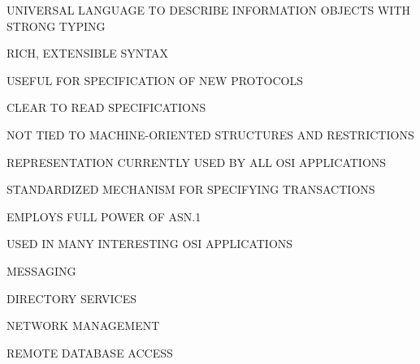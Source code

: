 \begin{bwslide}

\begin{nrtc}
\item	UNIVERSAL LANGUAGE TO DESCRIBE INFORMATION OBJECTS WITH STRONG TYPING

\item	RICH, EXTENSIBLE SYNTAX

\item	USEFUL FOR SPECIFICATION OF NEW PROTOCOLS
    \begin{nrtc}
    \item	CLEAR TO READ SPECIFICATIONS

    \item	NOT TIED TO MACHINE-ORIENTED STRUCTURES AND RESTRICTIONS
    \end{nrtc}

\item	REPRESENTATION CURRENTLY USED BY ALL OSI APPLICATIONS
\end{nrtc}
\end{bwslide}


\begin{bwslide}

\begin{nrtc}
\item	STANDARDIZED MECHANISM FOR SPECIFYING TRANSACTIONS

\item	EMPLOYS FULL POWER OF ASN.1

\item	USED IN MANY INTERESTING OSI APPLICATIONS
    \begin{nrtc}
    \item	MESSAGING

    \item	DIRECTORY SERVICES

    \item	NETWORK MANAGEMENT

    \item	REMOTE DATABASE ACCESS
    \end{nrtc}
\end{nrtc}
\end{bwslide}

